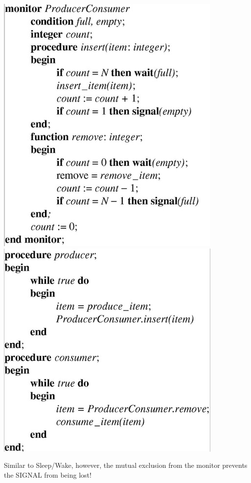 \documentclass[12pt,a4paper]{article}
\theoremstyle{definition}
\begin{document}
\begin{tcolorbox}
	\begin{center}
		\includegraphics[scale=0.4]{m1/producerConsumerMonitor1}
		\includegraphics[scale=0.4]{m1/producerConsumerMonitor2}
	\end{center}
	
	Similar to Sleep/Wake, however, the mutual exclusion from the monitor prevents the SIGNAL from being lost! 
\end{tcolorbox}
\end{document}
